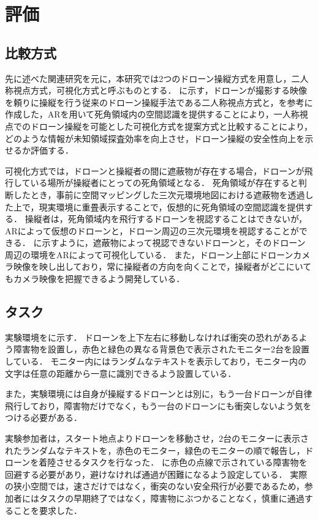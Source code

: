 \documentclass[a4paper,11pt]{ujreport}
\begin{document}
\chapter{評価}
\label{chap:Experiment}

\section{比較方式}
\label{sec:ComparisonMethod}
先に述べた関連研究\cite{article-ar05}を元に，本研究では2つのドローン操縦方式を用意し，二人称視点方式，可視化方式と呼ぶものとする．
に示す，ドローンが撮影する映像を頼りに操縦を行う従来のドローン操縦手法である二人称視点方式と，を参考に作成した，ARを用いて死角領域内の空間認識を提供することにより，一人称視点でのドローン操縦を可能とした可視化方式を提案方式と比較することにより，どのような情報が未知領域探査効率を向上させ，ドローン操縦の安全性向上を示せるか評価する．
\par
可視化方式では，ドローンと操縦者の間に遮蔽物が存在する場合，ドローンが飛行している場所が操縦者にとっての死角領域となる．
死角領域が存在すると判断したとき，事前に空間マッピングした三次元環境地図における遮蔽物を透過した上で，現実環境に重畳表示することで，仮想的に死角領域の空間認識を提供する．
操縦者は，死角領域内を飛行するドローンを視認することはできないが，ARによって仮想のドローンと，ドローン周辺の三次元環境を視認することができる．
に示すように，遮蔽物によって視認できないドローンと，そのドローン周辺の環境をARによって可視化している．
また，ドローン上部にドローンカメラ映像を映し出しており，常に操縦者の方向を向くことで，操縦者がどこにいてもカメラ映像を把握できるよう開発している．

\section{タスク}
\label{sec:Task}

実験環境をに示す．
ドローンを上下左右に移動しなければ衝突の恐れがあるよう障害物を設置し，赤色と緑色の異なる背景色で表示されたモニター2台を設置している．
モニター内にはランダムなテキストを表示しており，モニター内の文字は任意の距離から一意に識別できるよう設置している．
\par
また，実験環境には自身が操縦するドローンとは別に，もう一台ドローンが自律飛行しており，障害物だけでなく，もう一台のドローンにも衝突しないよう気をつける必要がある．
\par
実験参加者は，スタート地点よりドローンを移動させ，2台のモニターに表示されたランダムなテキストを，赤色のモニター，緑色のモニターの順で報告し，ドローンを着陸させるタスクを行なった．
に赤色の点線で示されている障害物を回避する必要があり，避けなければ通過が困難になるよう設定している．
実際の狭小空間では，速さだけではなく，衝突のない安全飛行が必要であるため，参加者にはタスクの早期終了ではなく，障害物にぶつかることなく，慎重に通過することを要求した．
\end{document}
